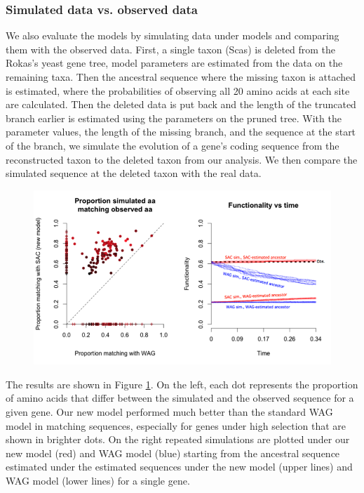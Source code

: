 \subsubsection{Simulated data vs. observed data}
We also evaluate the models by simulating data under models and comparing them with the observed data. 
First, a single taxon (Scas) is deleted from the Rokas's yeast gene tree, model parameters are estimated from the data on the remaining taxa. 
Then the ancestral sequence where the missing taxon is attached is estimated, where the probabilities of observing all 20 amino acids at each site are calculated. 
Then the deleted data is put back and the length of the truncated branch earlier is estimated using the parameters on the pruned tree. 
With the parameter values, the length of the missing branch, and the sequence at the start of the branch, we simulate the evolution of a gene's coding sequence from the reconstructed taxon to the deleted taxon from our analysis.
We then compare the simulated sequence at the deleted taxon with the real data. 
\begin{figure}[h]
\centering
\includegraphics[width=\textwidth]{simulation.png}
\label{fig:simulation}
\end{figure}
The results are shown in Figure \ref{fig:simulation}. 
On the left, each dot represents the proportion of amino acids that differ between the simulated and the observed sequence for a given gene. 
Our new model performed much better than the standard WAG model in matching sequences, especially for genes under high selection that are shown in brighter dots. 
On the right repeated simulations are plotted under our new model (red) and WAG model (blue) starting from the ancestral sequence estimated under the estimated sequences under the new model (upper lines) and WAG model (lower lines) for a single gene. 
